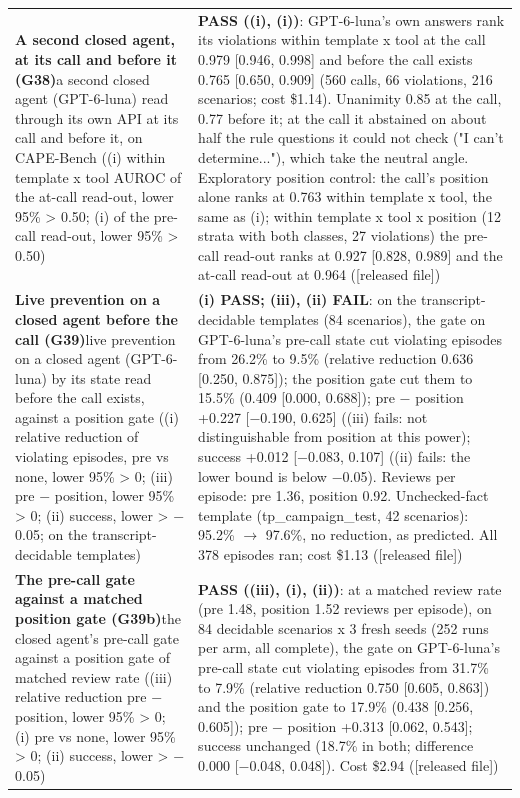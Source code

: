 {\begin{longtable}{p{}p{}}
\textbf{A second closed agent, at its call and before it (G38)}\newline a second closed agent (GPT-6-luna) read through its own API at its call and before it, on CAPE-Bench ((i) within template x tool AUROC of the at-call read-out, lower 95\% > 0.50; (i) of the pre-call read-out, lower 95\% > 0.50) & \textbf{PASS ((i), (i))}: GPT-6-luna's own answers rank its violations within template x tool at the call 0.979 [0.946, 0.998] and before the call exists 0.765 [0.650, 0.909] (560 calls, 66 violations, 216 scenarios; cost \$1.14). Unanimity 0.85 at the call, 0.77 before it; at the call it abstained on about half the rule questions it could not check ("I can't determine..."), which take the neutral angle. Exploratory position control: the call's position alone ranks at 0.763 within template x tool, the same as (i); within template x tool x position (12 strata with both classes, 27 violations) the pre-call read-out ranks at 0.927 [0.828, 0.989] and the at-call read-out at 0.964 ([released file])\\[2pt]
\textbf{Live prevention on a closed agent before the call (G39)}\newline live prevention on a closed agent (GPT-6-luna) by its state read before the call exists, against a position gate ((i) relative reduction of violating episodes, pre vs none, lower 95\% > 0; (iii) pre $-$ position, lower 95\% > 0; (ii) success, lower > $-$0.05; on the transcript-decidable templates) & \textbf{(i) PASS; (iii), (ii) FAIL}: on the transcript-decidable templates (84 scenarios), the gate on GPT-6-luna's pre-call state cut violating episodes from 26.2\% to 9.5\% (relative reduction 0.636 [0.250, 0.875]); the position gate cut them to 15.5\% (0.409 [0.000, 0.688]); pre $-$ position +0.227 [$-$0.190, 0.625] ((iii) fails: not distinguishable from position at this power); success +0.012 [$-$0.083, 0.107] ((ii) fails: the lower bound is below $-$0.05). Reviews per episode: pre 1.36, position 0.92. Unchecked-fact template (tp\_campaign\_test, 42 scenarios): 95.2\% $\rightarrow$ 97.6\%, no reduction, as predicted. All 378 episodes ran; cost \$1.13 ([released file])\\[2pt]
\textbf{The pre-call gate against a matched position gate (G39b)}\newline the closed agent's pre-call gate against a position gate of matched review rate ((iii) relative reduction pre $-$ position, lower 95\% > 0; (i) pre vs none, lower 95\% > 0; (ii) success, lower > $-$0.05) & \textbf{PASS ((iii), (i), (ii))}: at a matched review rate (pre 1.48, position 1.52 reviews per episode), on 84 decidable scenarios x 3 fresh seeds (252 runs per arm, all complete), the gate on GPT-6-luna's pre-call state cut violating episodes from 31.7\% to 7.9\% (relative reduction 0.750 [0.605, 0.863]) and the position gate to 17.9\% (0.438 [0.256, 0.605]); pre $-$ position +0.313 [0.062, 0.543]; success unchanged (18.7\% in both; difference 0.000 [$-$0.048, 0.048]). Cost \$2.94 ([released file])\\[2pt]

\end{longtable}}
